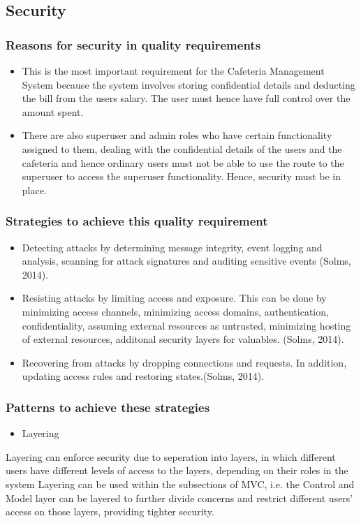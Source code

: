 \documentclass[a4paper,12pt]{article}
\begin{document}
\subsection{Security}
\subsubsection{Reasons for security in quality requirements}
 \begin{itemize}
 \item This is the most important requirement for the Cafeteria Management System because the system involves storing confidential details and deducting the bill from the users salary. The user must hence have full control over the amount spent.  
\item There are also superuser and admin roles who have certain functionality assigned to them, dealing with the confidential details of the users and the cafeteria and hence ordinary users must not be able to use the route to the superuser to access the superuser functionality. Hence, security must be in place.
 \end{itemize}
 \subsubsection{Strategies to achieve this quality requirement}
 \begin{itemize}
 \item Detecting attacks by determining message integrity, event logging and analysis, scanning for attack signatures and auditing sensitive events (Solms, 2014).
\item Resisting attacks by limiting access and exposure. This can be done by minimizing access channels, minimizing access domains, authentication, confidentiality, assuming external resources as untrusted, minimizing hosting of external resources, additonal security layers for valuables. (Solms, 2014).
\item Recovering from attacks by dropping connections and requests. In addition, updating access rules and restoring states.(Solms, 2014).
 \end{itemize}
\subsubsection{Patterns to achieve these strategies}
 \begin{itemize} 
 \item Layering
\end{itemize} 
Layering can enforce security due to seperation into layers, in which different users have different levels of access to the layers, depending on their roles in the system
Layering can be used within the subsections of MVC, i.e. the Control and Model layer can be layered to further divide concerns and restrict different users' access on those layers, providing tighter security.
\end{document}
